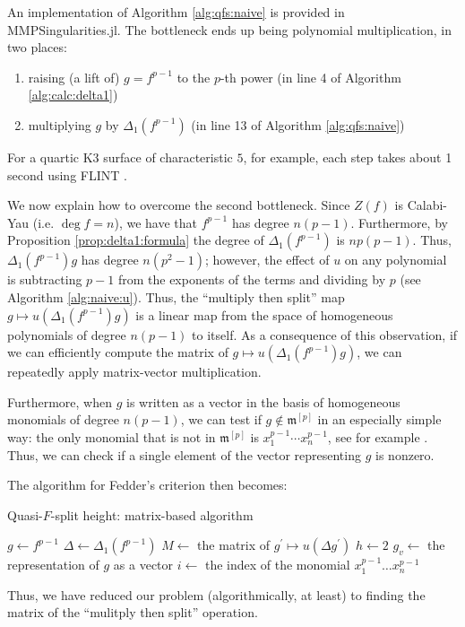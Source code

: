 An implementation of Algorithm \ref{alg:qfs:naive}
is provided in MMPSingularities.jl.
The bottleneck ends up being polynomial multiplication, 
in two places:
\begin{enumerate}[(1)]
    \item raising (a lift of) \(g = f^{p-1}\) to the \(p\)-th power 
        (in line 4 of Algorithm \ref{alg:calc:delta1})
    \item multiplying \(g\) by \(\Delta_{1}(f^{p-1})\) 
        (in line 13 of Algorithm \ref{alg:qfs:naive})
\end{enumerate}

\noindent For a quartic K3 surface of characteristic \(5\),
for example, each step takes about 1 second 
using FLINT \cite{flint-2023-flint}. 

We now explain how to overcome the second
bottleneck. Since \(Z(f)\) is Calabi-Yau
(i.e. \(\deg f = n\)), we have that \(f^{p-1}\) has degree
\(n(p-1)\). 
Furthermore, by Proposition \ref{prop:delta1:formula}
the degree of \(\Delta_{1}(f^{p-1})\) 
is \(np(p - 1)\).
Thus, \(\Delta_{1}(f^{p-1})g\) has degree
\(n(p^{2} - 1)\); however, the effect 
of \(u\) on any polynomial is subtracting \(p-1\)
from the exponents of the terms and dividing by \(p\) 
(see Algorithm \ref{alg:naive:u}).
Thus, the ``multiply then split'' map 
\(g \mapsto u(\Delta_{1}(f^{p-1}) g)\) 
is a linear map from 
the space of homogeneous polynomials of degree \(n(p-1)\) 
to itself.
As a consequence of this observation,
if we can efficiently compute the matrix of 
\(g \mapsto u(\Delta_{1}(f^{p-1})g)\),
we can repeatedly apply matrix-vector multiplication.

Furthermore, when \(g\) is written as a vector 
in the basis of homogeneous monomials of degree
\(n(p-1)\), we can test if \(g \notin \mathfrak{m}^{[p]}\) 
in an especially simple way: the only 
monomial that is not in \(\mathfrak{m}^{[p]}\) is
\(x_{1}^{p-1}\cdots x_{n}^{p-1}\), 
see for example \cite{kty-2022-fedder}.
Thus, we can check if a single element of the vector representing
\(g\) is nonzero.

The algorithm for Fedder's criterion then becomes:

\begin{algorithm}[H]
\caption{Quasi-\(F\)-split height: matrix-based algorithm}
\label{alg:qfs:matrix}
$g \gets f^{p - 1}$\;
$\Delta \gets \Delta_1(f^{p - 1})$\;
$M \gets $ the matrix of $g^{\prime} \mapsto u(\Delta g^{\prime})$\;
$h \gets 2$\;
$g_v \gets $ the representation of $g$ as a vector\;
$i \gets $ the index of the monomial $x_{1}^{p - 1} \dots x_{n}^{p - 1}$\;
\end{algorithm}

Thus, we have reduced our problem (algorithmically, at least)
to finding the matrix of the ``mulitply then split'' operation.
